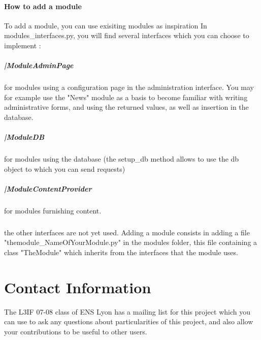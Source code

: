 \documentclass{article}
\begin{document}
 \paragraph{How to add a module}
To add a module, you can use exisiting modules as inspiration In modules\_interfaces.py, you will find several interfaces which you can choose to implement : 
    \subparagraph{|ModuleAdminPage} for modules using a configuration page in the administration interface. You may for example use the "News" module as a basis to become familiar with writing administrative forms, and using the returned values, as well as insertion in the database.
 
 \subparagraph{|ModuleDB} for modules using the database (the setup\_db method allows to use the db object to which you can send requests)
  \subparagraph{|ModuleContentProvider} for modules furnishing content.
     \subparagraph{} the other interfaces are not yet used.
      Adding a module consists in adding a file "themodule\_NameOfYourModule.py" in the modules folder, this file containing a class "TheModule" which inherits from the interfaces that the module uses.

 \section{Contact Information}
 The L3IF 07-08 class of ENS Lyon has a mailing list for this project which you can use to ask any questions about particularities of this project, and also allow your contributions to be useful to other users.
\end{document}
